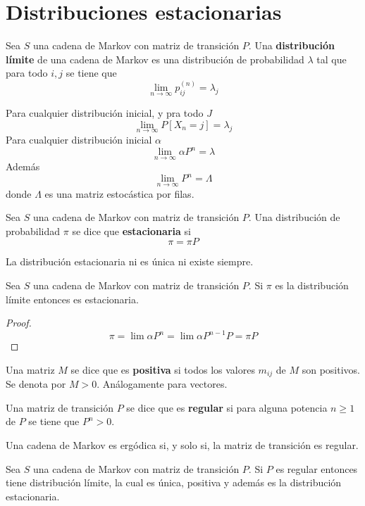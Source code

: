 \documentclass[PREyA.tex]{subfiles}
\begin{document}
\section{Distribuciones estacionarias}
\begin{defi}
Sea $S$ una cadena de Markov con matriz de transición $P$. Una \textbf{distribución límite} de una cadena de Markov es una distribución de probabilidad $\lambda$ tal que para todo $i,j$ se tiene que
$$
\lim_{n\to \infty} p_{ij}^{(n)}=\lambda_j
$$
\end{defi}
\begin{prop}
Para cualquier distribución inicial, y pra todo $J$
$$
\lim_{n\to \infty} P[X_n=j]=\lambda_j
$$
Para cualquier distribución inicial $\alpha$
$$
\lim_{n\to \infty} \alpha P^n = \lambda
$$
Además
$$
\lim_{n\to \infty}  P^n = \Lambda
$$
donde $\Lambda$ es una matriz estocástica por filas.
\end{prop}
\begin{defi}
Sea $S$ una cadena de Markov con matriz de transición $P$. Una distribución de probabilidad $\pi$ se dice que \textbf{estacionaria} si 
$$
\pi = \pi P
$$
\end{defi}
\begin{nota}
La distribución estacionaria ni es única ni existe siempre.
\end{nota}
\begin{prop}
Sea $S$ una cadena de Markov con matriz de transición $P$. Si $\pi$ es la distribución límite entonces es estacionaria.
\end{prop}
\begin{proof}
$$
\pi = \lim \alpha P^{n} = \lim \alpha P^{n-1} P = \pi P
$$
\end{proof}
\begin{defi}
Una matriz $M$ se dice que es \textbf{positiva} si todos los valores $m_{ij}$ de $M$ son positivos. Se denota por $M>0$. Análogamente para vectores.
\end{defi}
\begin{defi} Una matriz de transición $P$ se dice que es \textbf{regular} si para alguna potencia $n\geq 1$ de $P$ se tiene que $P^n>0$.
\end{defi}
\begin{theorem}
Una cadena de Markov es ergódica si, y solo si, la matriz de transición es regular.
\end{theorem}
\begin{theorem}
Sea $S$ una cadena de Markov con matriz de transición $P$. Si $P$ es regular entonces tiene distribución límite, la cual es única, positiva y además es la distribución estacionaria.
\end{theorem}
\end{document}
